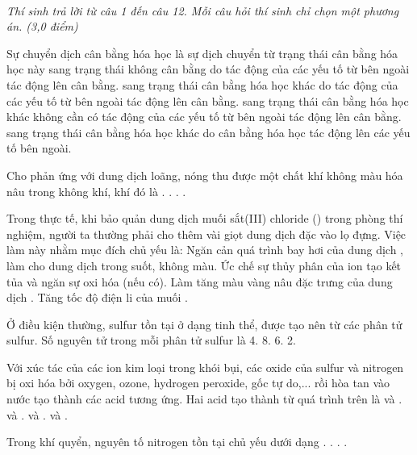 \documentclass[11pt,a4paper]{article}
\begin{document}
 \\
\textit{Thí sinh trả lời từ câu 1 đến câu 12. Mỗi câu hỏi thí sinh chỉ chọn một phương án. (3,0 điểm)}
\vspace{4pt}
\begin{ex}
Sự chuyển dịch cân bằng hóa học là sự dịch chuyển từ trạng thái cân bằng hóa học này
\choice
{sang trạng thái không cân bằng do tác động của các yếu tố từ bên ngoài tác động lên cân bằng.}
{sang trạng thái cân bằng hóa học khác do tác động của các yếu tố từ bên ngoài tác động lên cân bằng.}
{sang trạng thái cân bằng hóa học khác không cần có tác động của các yếu tố từ bên ngoài tác động lên cân bằng.}
{sang trạng thái cân bằng hóa học khác do cân bằng hóa học tác động lên các yếu tố bên ngoài.}
\loigiai{}
\end{ex}
\begin{ex}
Cho  phản ứng với dung dịch  loãng, nóng thu được một chất khí không màu hóa nâu trong không khí, khí đó là
\choice
{.}
{.}
{.}
{.}
\loigiai{}
\end{ex}
\begin{ex}
Trong thực tế, khi bảo quản dung dịch muối sắt(III) chloride () trong phòng thí nghiệm, người ta thường phải cho thêm vài giọt dung dịch  đặc vào lọ đựng. Việc làm này nhằm mục đích chủ yếu là:
\choice
{Ngăn cản quá trình bay hơi của dung dịch , làm cho dung dịch trong suốt, không màu.}
{Ức chế sự thủy phân của ion  tạo kết tủa  và ngăn sự oxi hóa  (nếu có).}
{Làm tăng màu vàng nâu đặc trưng của dung dịch .}
{Tăng tốc độ điện li của muối .}
\loigiai{}
\end{ex}
\begin{ex}
Ở điều kiện thường, sulfur tồn tại ở dạng tinh thể, được tạo nên từ các phân tử sulfur. Số nguyên tử trong mỗi phân tử sulfur là
\choice
{4.}
{8.}
{6.}
{2.}
\loigiai{}
\end{ex}
\begin{ex}
Với xúc tác của các ion kim loại trong khói bụi, các oxide của sulfur và nitrogen bị oxi hóa bởi oxygen, ozone, hydrogen peroxide, gốc tự do,... rồi hòa tan vào nước tạo thành các acid tương ứng. Hai acid tạo thành từ quá trình trên là
\choice
{ và .}
{ và .}
{ và .}
{ và .}
\loigiai{}
\end{ex}
\begin{ex}
Trong khí quyển, nguyên tố nitrogen tồn tại chủ yếu dưới dạng
\choice
{.}
{.}
{.}
{.}
\loigiai{}
\end{ex}
\end{document}
